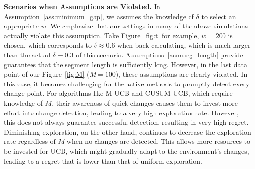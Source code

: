 \documentclass[twoside]{article}
\theoremstyle{plain}
\theoremstyle{definition}
\theoremstyle{remark}
\begin{document}
\textbf{Scenarios when Assumptions are Violated.} In Assumption~\ref{ass:minimum_gap}, we assumes the knowledge of $\delta$ to select an appropriate $w$. We emphasize that our settings in many of the above simulations actually violate this assumption. Take Figure~\ref{fig:t} for example, $w=200$ is chosen, which corresponds to $\delta\approx 0.6$ when back calculating, which is much larger than the actual $\delta=0.3$ of this scenario. Assumptions~\ref{asm:seg_length} provide guarantees that the segment length is sufficiently long. However, in the last data point of our Figure~\ref{fig:M} ($M=100$), these assumptions are clearly violated. In this case, it becomes challenging for the active methods to promptly detect every change point. For algorithms like M-UCB and CUSUM-UCB, which require knowledge of $M$, their awareness of quick changes causes them to invest more effort into change detection, leading to a very high exploration rate. However, this does not always guarantee successful detection, resulting in very high regret. Diminishing exploration, on the other hand, continues to decrease the exploration rate regardless of $M$ when no changes are detected. This allows more resources to be invested for UCB, which might gradually adapt to the environment's changes, leading to a regret that is lower than that of uniform exploration.

\newpage
\end{document}

